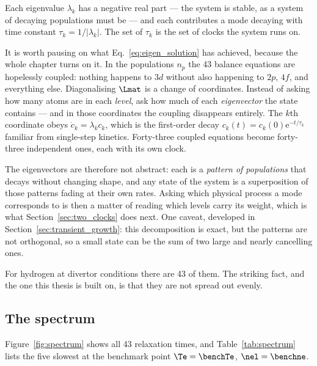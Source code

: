 \noindent Each eigenvalue $\lambda_k$ has a negative real part --- the system is
stable, as a system of decaying populations must be --- and each contributes a
mode decaying with time constant $\tau_k = 1/|\lambda_k|$. The set of $\tau_k$
is the set of clocks the system runs on.

It is worth pausing on what Eq.~\eqref{eq:eigen_solution} has achieved, because
the whole chapter turns on it. In the populations $n_p$ the 43 balance equations
are hopelessly coupled: nothing happens to $3d$ without also happening to $2p$,
$4f$, and everything else. Diagonalising $\Lmat$ is a change of coordinates.
Instead of asking how many atoms are in each \emph{level}, ask how much of each
\emph{eigenvector} the state contains --- and in those coordinates the coupling
disappears entirely. The $k$th coordinate obeys $\dot{c}_k = \lambda_k c_k$,
which is the first-order decay $c_k(t) = c_k(0)\mathrm{e}^{-t/\tau_k}$ familiar
from single-step kinetics. Forty-three coupled equations become forty-three
independent ones, each with its own clock.

The eigenvectors are therefore not abstract: each is a \emph{pattern of
populations} that decays without changing shape, and any state of the system is
a superposition of those patterns fading at their own rates. Asking which
physical process a mode corresponds to is then a matter of reading which levels
carry its weight, which is what Section~\ref{sec:two_clocks} does next. One
caveat, developed in Section~\ref{sec:transient_growth}: this decomposition is
exact, but the patterns are not orthogonal, so a small state can be the sum of
two large and nearly cancelling ones.

For hydrogen at divertor conditions there are 43 of them. The striking fact,
and the one this thesis is built on, is that they are not spread out evenly.

\subsection{The spectrum}

Figure~\ref{fig:spectrum} shows all 43 relaxation times, and
Table~\ref{tab:spectrum} lists the five slowest at the benchmark point
$\Te = \benchTe$, $\nel = \benchne$.

